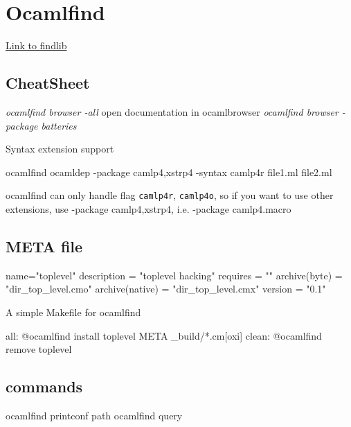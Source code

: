 \section{Ocamlfind}
\label{sec:ocamlfind}
\href{http://projects.camlcity.org/projects/dl/findlib-1.2.3/doc/ref-html/r17.html}{Link  to findlib}

\subsection{CheatSheet}

\begin{bashcode}
\emph{ocamlfind browser -all } open documentation in ocamlbrowser 
\emph{ocamlfind browser -package batteries}
\end{bashcode}

Syntax extension support  

\begin{bashcode}
ocamlfind ocamldep -package camlp4,xstrp4 -syntax camlp4r file1.ml file2.ml 
\end{bashcode}
ocamlfind can only handle flag \verb|camlp4r|, \verb|camlp4o|, so if
you want to use other extensions, use -package camlp4,xstrp4,
i.e. -package camlp4.macro
  


\subsection{META file}

\begin{bashcode}
name="toplevel"
description = "toplevel hacking"
requires = ""
archive(byte) = "dir_top_level.cmo"
archive(native) = "dir_top_level.cmx"
version = "0.1"
\end{bashcode}


A simple Makefile for ocamlfind 

\begin{bashcode}
all:
	   @ocamlfind install toplevel META _build/*.cm[oxi]
clean: 
	   @ocamlfind remove toplevel 
\end{bashcode}

\subsection{commands}
\begin{bashcode}
  ocamlfind printconf path
  ocamlfind query 
\end{bashcode}  
